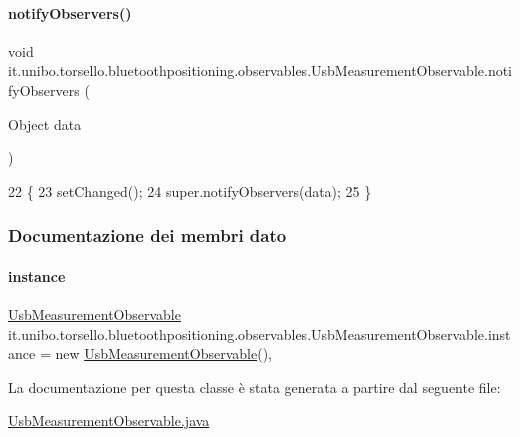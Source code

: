 \paragraph{\texorpdfstring{notify\+Observers()}{notifyObservers()}}
{\footnotesize\ttfamily void it.\+unibo.\+torsello.\+bluetoothpositioning.\+observables.\+Usb\+Measurement\+Observable.\+notify\+Observers (\begin{DoxyParamCaption}\item[{Object}]{data }\end{DoxyParamCaption})}


\begin{DoxyCode}
22                                              \{
23         setChanged();
24         super.notifyObservers(data);
25     \}
\end{DoxyCode}


\subsubsection{Documentazione dei membri dato}
\hypertarget{classit_1_1unibo_1_1torsello_1_1bluetoothpositioning_1_1observables_1_1UsbMeasurementObservable_a19cb655efdf8656403f342caca294e62_a19cb655efdf8656403f342caca294e62}{}\label{classit_1_1unibo_1_1torsello_1_1bluetoothpositioning_1_1observables_1_1UsbMeasurementObservable_a19cb655efdf8656403f342caca294e62_a19cb655efdf8656403f342caca294e62} 
\paragraph{\texorpdfstring{instance}{instance}}
{\footnotesize\ttfamily \hyperlink{classit_1_1unibo_1_1torsello_1_1bluetoothpositioning_1_1observables_1_1UsbMeasurementObservable}{Usb\+Measurement\+Observable} it.\+unibo.\+torsello.\+bluetoothpositioning.\+observables.\+Usb\+Measurement\+Observable.\+instance = new \hyperlink{classit_1_1unibo_1_1torsello_1_1bluetoothpositioning_1_1observables_1_1UsbMeasurementObservable}{Usb\+Measurement\+Observable}()\hspace{0.3cm}{\ttfamily [static]}, {\ttfamily [private]}}



La documentazione per questa classe è stata generata a partire dal seguente file\+:\begin{DoxyCompactItemize}
\item 
\hyperlink{UsbMeasurementObservable_8java}{Usb\+Measurement\+Observable.\+java}\end{DoxyCompactItemize}
